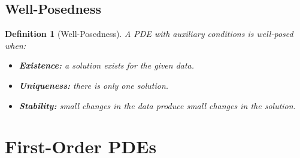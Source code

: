 \documentclass{article}
\newtheorem{definition}{Definition}
\begin{document}
\subsection{Well-Posedness}
\begin{definition}[Well-Posedness]
    A PDE with auxiliary conditions is well-posed when:
    \begin{itemize}
        \item \textbf{Existence:} a solution exists for the given data.
        \item \textbf{Uniqueness:} there is only one solution.
        \item \textbf{Stability:} small changes in the data produce small changes in the solution.
    \end{itemize}
\end{definition}


\section{First-Order PDEs}
\end{document}
